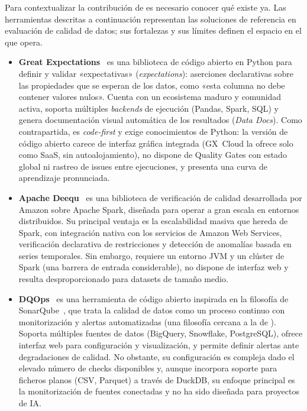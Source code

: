 Para contextualizar la contribución de \dataqual es necesario conocer qué
existe ya. Las herramientas descritas a continuación representan las
soluciones de referencia en evaluación de calidad de datos; sus fortalezas
y sus límites definen el espacio en el que \dataqual opera.

\begin{itemize}
  \item \textbf{Great Expectations}~\citep{greatexpectations} es una biblioteca
    de código abierto en Python para definir y validar «expectativas»
    (\emph{expectations}): aserciones declarativas sobre las propiedades que se
    esperan de los datos, como «esta columna no debe contener valores nulos».
    Cuenta con un ecosistema maduro y comunidad activa, soporta múltiples
    \emph{backends} de ejecución (Pandas, Spark, \ac{SQL}) y genera
    documentación visual automática de los resultados (\emph{Data Docs}). Como
    contrapartida, es \emph{code-first} y exige conocimientos de Python: la
    versión de código abierto carece de interfaz gráfica integrada (GX~Cloud
    la ofrece solo como \ac{SaaS}, sin autoalojamiento), no dispone de Quality
    Gates con estado global ni rastreo de issues entre ejecuciones, y presenta
    una curva de aprendizaje pronunciada.

  \item \textbf{Apache Deequ}~\citep{schelter2018} es una biblioteca de
    verificación de calidad desarrollada por Amazon sobre Apache Spark, diseñada
    para operar a gran escala en entornos distribuidos. Su principal ventaja es
    la escalabilidad masiva que hereda de Spark, con integración nativa con los
    servicios de Amazon Web Services, verificación declarativa de restricciones y
    detección de anomalías basada en series temporales. Sin embargo, requiere un
    entorno JVM y un clúster de Spark (una barrera de entrada considerable),
    no dispone de interfaz web y resulta desproporcionado para datasets de
    tamaño medio.

  \item \textbf{DQOps}~\citep{dqops} es una herramienta de código abierto
    inspirada en la filosofía de SonarQube~\citep{sonarqube}, que trata la
    calidad de datos como un proceso continuo con monitorización y alertas
    automatizadas (una filosofía cercana a la de \dataqual). Soporta múltiples
    fuentes de datos (BigQuery, Snowflake, PostgreSQL), ofrece interfaz web para
    configuración y visualización, y permite definir alertas ante degradaciones
    de calidad. No obstante, su configuración es compleja dado el elevado número
    de checks disponibles y, aunque incorpora soporte para ficheros planos
    (\ac{CSV}, Parquet) a través de DuckDB, su enfoque principal es la
    monitorización de fuentes conectadas y no ha sido diseñada para proyectos de
    \ac{IA}.


\end{itemize}
